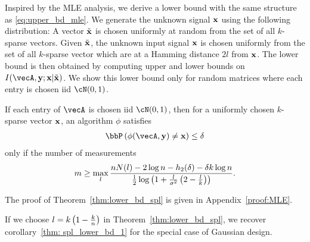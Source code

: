 Inspired by the MLE analysis, we derive a lower bound with the same structure as \eqref{eq:upper_bd_mle}. We generate the unknown signal $\mathbf{x}$ using the following distribution: A vector $\tilde{\mathbf{x}}$ is chosen uniformly at random from the set of all $k$-sparse vectors. Given $\tilde{\mathbf{x}}$, the unknown input signal $\mathbf{x}$ is chosen uniformly from the set of all $k$-sparse vector which are at a Hamming distance $2l$ from $\mathbf{x}$. 
The lower bound is then obtained by computing upper and lower bounds on $I(\vecA, \by;\bx|\tilde{\bx})$.
We show this lower bound only for random matrices where each entry is chosen iid $\cN(0,1)$.
\begin{theorem}\label{thm:lower_bd_spl}
If each entry of $\vecA$ is chosen iid $\cN(0,1)$, then for a uniformly chosen $k$-sparse vector $\mathbf{x}$, an algorithm $\phi$ satisfies 
\begin{align}
    \bbP\inp{\phi(\vecA, {\by}) \neq \bx}\leq \delta\label{eq:spl_lower_bd_l}
\end{align}  only if the number of measurements $$m\geq \max_l\frac{nN(l) - 2\log{n}- h_2(\delta) - \delta k\log{n}}{\frac{1}{2}\log\left(1+\frac{l}{\sigma^2}\left(2-\frac{l}{k}\right)\right)} .$$
\end{theorem} The proof of Theorem~\ref{thm:lower_bd_spl} is given in Appendix~\ref{proof:MLE}.

If we choose $l = k\left(1-\frac{k}{n}\right)$ in Theorem~\ref{thm:lower_bd_spl}, we recover corollary~\ref{thm: spl_lower_bd_1} for the special case of Gaussian design.




